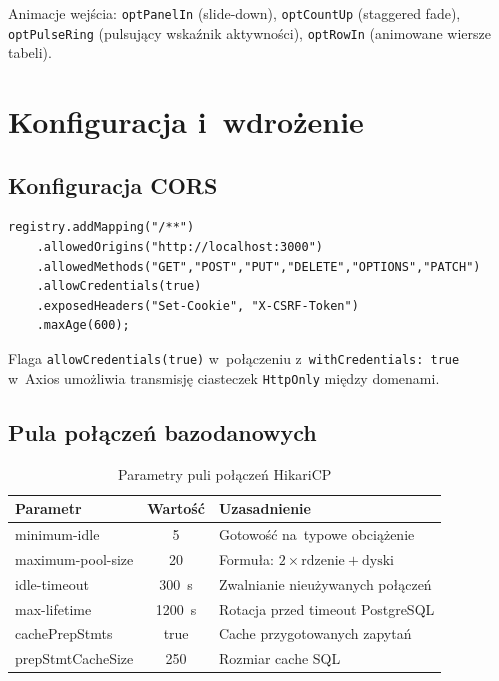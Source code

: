Animacje wejścia: \texttt{optPanelIn} (slide-down), \texttt{optCountUp} (staggered fade), \texttt{optPulseRing} (pulsujący wskaźnik aktywności), \texttt{optRowIn} (animowane wiersze tabeli).

\section{Konfiguracja i~wdrożenie}

\subsection{Konfiguracja CORS}

\begin{verbatim}
registry.addMapping("/**")
    .allowedOrigins("http://localhost:3000")
    .allowedMethods("GET","POST","PUT","DELETE","OPTIONS","PATCH")
    .allowCredentials(true)
    .exposedHeaders("Set-Cookie", "X-CSRF-Token")
    .maxAge(600);
\end{verbatim}

Flaga \texttt{allowCredentials(true)} w~połączeniu z~\texttt{withCredentials: true} w~Axios umożliwia transmisję ciasteczek \texttt{HttpOnly} między domenami.

\subsection{Pula połączeń bazodanowych}

\begin{table}[H]
\centering
\caption{Parametry puli połączeń HikariCP}
\begin{tabular}{|l|c|l|}
\hline
\textbf{Parametr} & \textbf{Wartość} & \textbf{Uzasadnienie} \\ \hline
minimum-idle & 5 & Gotowość na~typowe obciążenie \\ \hline
maximum-pool-size & 20 & Formuła: $2 \times \text{rdzenie} + \text{dyski}$ \\ \hline
idle-timeout & 300~s & Zwalnianie nieużywanych połączeń \\ \hline
max-lifetime & 1200~s & Rotacja przed timeout PostgreSQL \\ \hline
cachePrepStmts & true & Cache przygotowanych zapytań \\ \hline
prepStmtCacheSize & 250 & Rozmiar cache SQL \\ \hline
\end{tabular}
\end{table}

